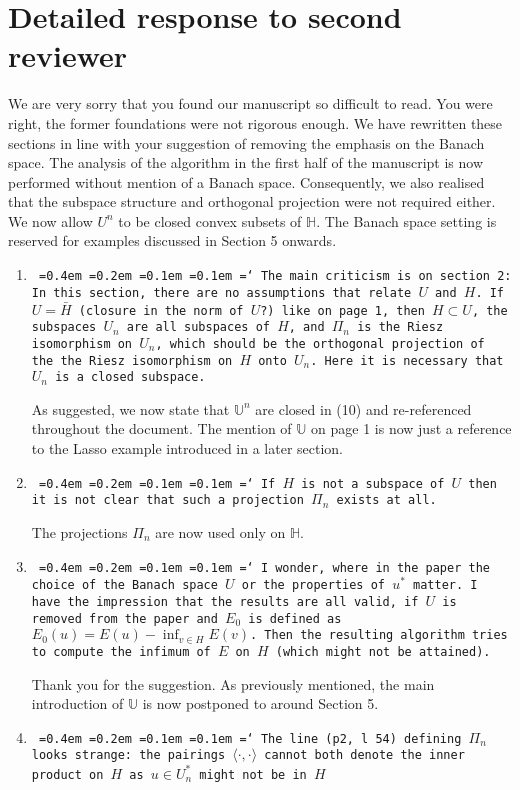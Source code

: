 \documentclass[12pt]{article}
\newcommand*\justify{%
	\fontdimen2\font=0.4em%
	\fontdimen3\font=0.2em%
	\fontdimen4\font=0.1em%
	\fontdimen7\font=0.1em%
	\hyphenchar\font=`\-%
}
\newcommand{\review}[1]{\texttt{\justify{#1}}}
\newcommand{\F}[1]{\mathbb{#1}}
\begin{document}
\section{Detailed response to second reviewer}
We are very sorry that you found our manuscript so difficult to read. You were right, the former foundations were not rigorous enough. We have rewritten these sections in line with your suggestion of removing the emphasis on the Banach space. The analysis of the algorithm in the first half of the manuscript is now performed without mention of a Banach space. Consequently, we also realised that the subspace structure and orthogonal projection were not required either. We now allow $U^n$ to be closed convex subsets of $\F H$. The Banach space setting is reserved for examples discussed in Section 5 onwards.

\begin{enumerate}
	\item \review{The main criticism is on section 2: In this section, there are no assumptions that relate $U$ and $H$. If $U=\bar{H}$ (closure in the norm of $U$?) like on page 1, then $H\subset U$, the subspaces $U_n$ are all subspaces of $H$, and $\Pi_n$ is the Riesz isomorphism on $U_n$, which should be the orthogonal projection of the the Riesz isomorphism on $H$ onto $U_n$. Here it is necessary that $U_n$ is a closed subspace.}
	
	As suggested, we now state that $\F U^n$ are closed in (10) and re-referenced throughout the document. The mention of $\F U$ on page 1 is now just a reference to the Lasso example introduced in a later section.
	
	\item \review{If $H$ is not a subspace of $U$ then it is not clear that such a projection $\Pi_n$ exists at all.}
	
	The projections $\Pi_n$ are now used only on $\F H$.
	
	\item \review{I wonder, where in the paper the choice of the Banach space $U$ or the properties of $u^*$ matter. I have the impression that the results are all valid, if $U$ is removed from the paper and $E_0$ is defined as $E_0(u)=E(u)-\inf_{v\in H}E(v)$. Then the resulting algorithm tries to compute the infimum of $E$ on $H$ (which might not be attained).}
	
	Thank you for the suggestion. As previously mentioned, the main introduction of $\F U$ is now postponed to around Section 5.
	
	\item \review{The line (p2, l 54) defining $\Pi_n$ looks strange: the pairings $\langle\cdot,\cdot\rangle$ cannot both denote the inner product on $H$ as $u\in U_n^*$ might not be in $H$}


\end{enumerate}
\end{document}
